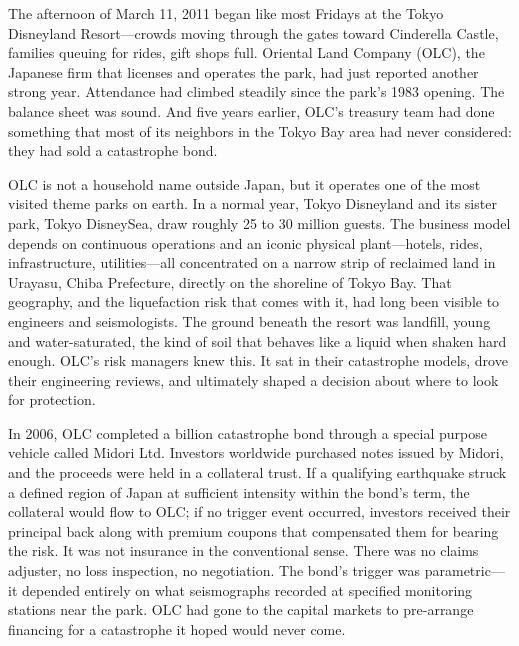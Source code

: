 \documentclass[11pt,openany]{book}
\begin{document}
\begin{corporateexample}

The afternoon of March 11, 2011 began like most Fridays at the Tokyo
Disneyland Resort---crowds moving through the gates toward Cinderella Castle,
families queuing for rides, gift shops full. Oriental Land Company (OLC), the
Japanese firm that licenses and operates the park, had just reported another
strong year. Attendance had climbed steadily since the park's 1983 opening.
The balance sheet was sound. And five years earlier, OLC's treasury team had
done something that most of its neighbors in the Tokyo Bay area had never
considered: they had sold a catastrophe bond.

OLC is not a household name outside Japan, but it operates one of the most
visited theme parks on earth. In a normal year, Tokyo Disneyland and its
sister park, Tokyo DisneySea, draw roughly 25 to 30 million guests. The
business model depends on continuous operations and an iconic physical
plant---hotels, rides, infrastructure, utilities---all concentrated on a
narrow strip of reclaimed land in Urayasu, Chiba Prefecture, directly on the
shoreline of Tokyo Bay. That geography, and the liquefaction risk that comes
with it, had long been visible to engineers and seismologists. The ground
beneath the resort was landfill, young and water-saturated, the kind of soil
that behaves like a liquid when shaken hard enough. OLC's risk managers knew
this. It sat in their catastrophe models, drove their engineering reviews, and
ultimately shaped a decision about where to look for protection.

In 2006, OLC completed a  billion catastrophe bond through a
special purpose vehicle called Midori Ltd. Investors worldwide purchased notes
issued by Midori, and the proceeds were held in a collateral trust. If a
qualifying earthquake struck a defined region of Japan at sufficient intensity
within the bond's term, the collateral would flow to OLC; if no trigger event
occurred, investors received their principal back along with premium coupons
that compensated them for bearing the risk. It was not insurance in the
conventional sense. There was no claims adjuster, no loss inspection, no
negotiation. The bond's trigger was parametric---it depended entirely on what
seismographs recorded at specified monitoring stations near the park. OLC had
gone to the capital markets to pre-arrange financing for a catastrophe it
hoped would never come.


\end{corporateexample}
\end{document}
